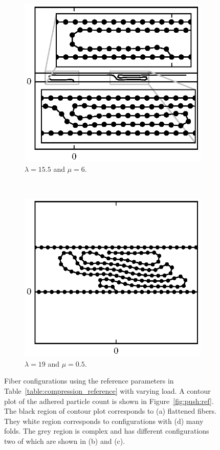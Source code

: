 {\begin{figure}[h!]
		\begin{subfigure}{.5\textwidth}
			\centering
			\includegraphics{./fig/ch3/push/ref/l15.5_m6.eps}
			\caption{$\lambda=15.5$ and $\mu=6$.\label{subfig:lonely_pancake}}
		\end{subfigure}%
		~
		\begin{subfigure}{.5\textwidth}
			\centering
			\includegraphics{./fig/ch3/push/ref/l19_m0.5.eps}
			\caption{$\lambda=19$ and $\mu=0.5$.\label{subfig:crushed}}
		\end{subfigure}
		\caption{Fiber configurations using the reference parameters in Table~\ref{table:compression_reference} with varying load. A contour plot of the adhered particle count is shown in Figure~\ref{fig:push:ref}. The black region of contour plot corresponds to (a) flattened fibers. They white region corresponds to configurations with (d) many folds. The grey region is complex and has different configurations two of which are shown in (b) and (c).\label{fig:ref_normal}}
	\end{figure}

}
